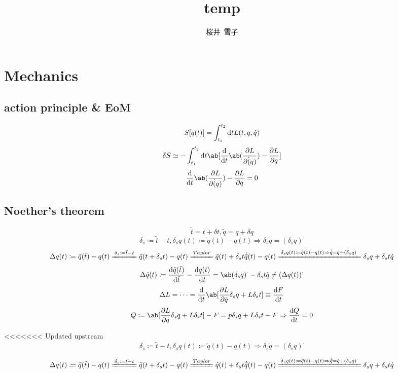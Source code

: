 \documentclass{article}
\title{temp}
\author{桜井\ 雪子}
\newcommand{\xleq}{\xlongequal}
\begin{document}
\maketitle
\tableofcontents

\section{Mechanics}

\subsection{action principle \& EoM}

\[ S[q(t)] = \int_{t_1}^{t_2} \odif{t} L(t, q, \dot{q}) \]
\[ \delta S \simeq - \int_{t_1}^{t_2} \odif{t} \ab[\odv{}{t} \ab(\pdv{L}{\dot(q)}) - \pdv{L}{q}] \]
\[ \odv{}{t} \ab(\pdv{L}{\dot(q)}) - \pdv{L}{q} = 0 \]

\subsection{Noether's theorem}

\[ \tilde{t} = t + \delta t, \tilde{q} = q + \delta q \]
\[ \delta_s \coloneqq \tilde{t} - t, \delta_s q(t) \coloneqq \tilde{q}(t) - q(t) \Rightarrow \delta_s \dot{q} = (\delta_s q)^{\cdot} \]
\[ \Delta q(t) \coloneqq \tilde{q}(\tilde{t}) - q(t) \xleq{\delta_s \coloneqq \tilde{t} - t}  \tilde{q}(t + \delta_s t) - q(t) \xleq{Taylor} \tilde{q}(t) + \delta_s t \dot{\tilde{q}}(t) - q(t) \xleq{\delta_s q(t) \coloneqq \tilde{q}(t) - q(t) \Rightarrow \dot{\tilde{q}} = \dot{q} + (\delta_s q)^{\cdot}} \delta_s q + \delta_s t \dot{q} \]
\[ \Delta \dot{q}(t) \coloneqq \odv{\tilde{q}(\tilde{t})}{\tilde{t}} - \odv{q(t)}{t} = \ab(\delta_s q)^{\cdot} - \delta_s t \ddot{q} \neq (\Delta q(t))^{\cdot} \]
\[ \Delta L = \cdots = \odv{}{t} \ab[\pdv{L}{\dot{q}} \delta_s q + L \delta_s t] \equiv \odv{F}{t} \]
\[ Q \coloneqq \ab[\pdv{L}{\dot{q}} \delta_s q + L \delta_s t] - F = p \delta_s q + L \delta_s t - F \Rightarrow \odv{Q}{t} = 0 \]

<<<<<<< Updated upstream
\[ \delta_s \coloneqq \tilde{t} - t, \delta_s q(t) \coloneqq \tilde{q}(t) - q(t) \Rightarrow \delta_s \dot{q} = (\delta_s q)^{\cdot} \]

\[ \Delta q(t) \coloneqq \tilde{q}(\tilde{t}) - q(t) \xlongequal{\delta_s \coloneqq \tilde{t} - t}  \tilde{q}(t + \delta_s t) - q(t) \xlongequal{Taylor} \tilde{q}(t) + \delta_s t \dot{\tilde{q}}(t) - q(t) \xlongequal{\delta_s q(t) \coloneqq \tilde{q}(t) - q(t) \Rightarrow \dot{\tilde{q}} = \dot{q} + (\delta_s q)^{\cdot}} \delta_s q + \delta_s t \dot{q} \]
\end{document}
